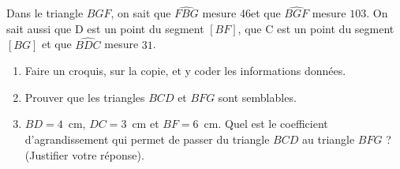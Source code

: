 \begin{minipage}{0.99\linewidth}

\exo

Dans le triangle $BGF$, on sait que $\widehat{FBG}$ mesure $46$\degre et que $\widehat{BGF}$ mesure $103$\degre. On sait aussi que D est un point du segment $[BF]$, que C est un point du segment $[BG]$ et que $\widehat{BDC}$ mesure $31$\degre.

		\begin{enumerate}
		\item Faire un croquis, sur la copie, et y coder les informations données.
		\item Prouver que les triangles $BCD$ et $BFG$ sont semblables.
		\item $BD= 4$~cm, $DC=3$~cm et $BF=6$~cm. Quel est le coefficient d'agrandissement qui permet de passer du triangle $BCD$ au triangle $BFG$ ? (Justifier votre réponse).
		\end{enumerate}	

\end{minipage}

\vspace{0.5cm}